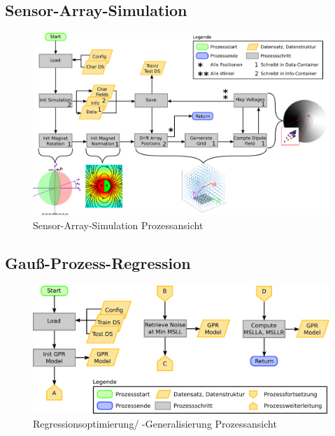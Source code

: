 \subsection{Sensor-Array-Simulation}\label{sub:sensor-array-pro}


\begin{figure}[tbph]
	\centering
	\includegraphics[width=\linewidth]{chapters/images/3-SW-E-OExp/Sensor-Array-Simulation}
	\caption[Sensor-Array-Simulation Prozessansicht]{Sensor-Array-Simulation Prozessansicht}
	\label{fig:sensor-array-simulation}
\end{figure}

\clearpage

\subsection{Gauß-Prozess-Regression}\label{sub:gpr-pro}


\begin{figure}[tbph]
	\centering
	\includegraphics[width=.8\linewidth]{chapters/images/3-SW-E-OExp/GPR_Optimization}
	\caption[Regressionsoptimierung/ -Generalisierung Prozessansicht]{Regressionsoptimierung/ -Generalisierung Prozessansicht}
	\label{fig:gproptimization}
\end{figure}


